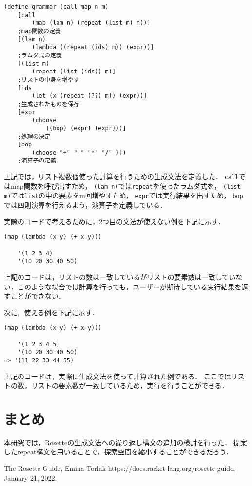 \documentclass[twocolumn]{jsarticle}
\begin{document}
\setlength{\baselineskip}{10pt}
\begin{verbatim}
(define-grammar (call-map n m)
    [call
        (map (lam n) (repeat (list m) n))]
    ;map関数の定義
    [(lam n)
        (lambda ((repeat (ids) m)) (expr))]
    ;ラムダ式の定義
    [(list m)
        (repeat (list (ids)) m)]  
    ;リストの中身を増やす
    [ids 
        (let (x (repeat (??) m)) (expr))]
    ;生成されたものを保存
    [expr 
        (choose 
            ((bop) (expr) (expr)))]
    ;処理の決定
    [bop 
        (choose "+" "-" "*" "/" )])
    ;演算子の定義
\end{verbatim}


上記では，リスト複数個使った計算を行うための生成文法を定義した．
\verb|call|ではmap関数を呼び出すため，
\verb|(lam n)|では\verb|repeat|を使ったラムダ式を，
\verb|(list m)|では\verb|list|の中の要素をm回増やすため，
\verb|expr|では実行結果を出すため，
\verb|bop|では四則演算を行えるよう，演算子を定義している．

実際のコードで考えるために，2つ目の文法が使えない例を下記に示す．
\setlength{\baselineskip}{10pt}
\begin{verbatim}
(map (lambda (x y) (+ x y)))

	'(1 2 3 4)
	'(10 20 30 40 50) 
\end{verbatim}

上記のコードは，リストの数は一致しているがリストの要素数は一致していない．このような場合では計算を行っても，ユーザーが期待している実行結果を返すことができない．

次に，使える例を下記に示す．
\setlength{\baselineskip}{10pt}
\begin{verbatim}
(map (lambda (x y) (+ x y)))

	'(1 2 3 4 5)
	'(10 20 30 40 50)         
=> '(11 22 33 44 55)
\end{verbatim}

上記のコードは，実際に生成文法を使って計算された例である．
ここではリストの数，リストの要素数が一致しているため，実行を行うことができる．

\section{まとめ}

本研究では，Rosetteの生成文法への繰り返し構文の追加の検討を行った．
提案したrepeat構文を用いることで，探索空間を縮小することができるだろう．

\begin{thebibliography}{99}
 The Rosette Guide, Emina Torlak https://docs.racket-lang.org/rosette-guide, January 21, 2022.

\end{thebibliography}
\end{document}

